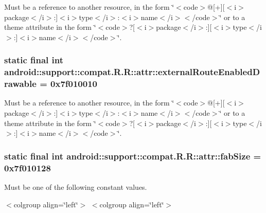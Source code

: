 Must be a reference to another resource, in the form \char`\"{}$<$code$>$@\mbox{[}+\mbox{]}\mbox{[}$<$i$>$package$<$/i$>$:\mbox{]}$<$i$>$type$<$/i$>$:$<$i$>$name$<$/i$>$$<$/code$>$\char`\"{} or to a theme attribute in the form \char`\"{}$<$code$>$?\mbox{[}$<$i$>$package$<$/i$>$:\mbox{]}\mbox{[}$<$i$>$type$<$/i$>$:\mbox{]}$<$i$>$name$<$/i$>$$<$/code$>$\char`\"{}. \hypertarget{classandroid_1_1support_1_1compat_1_1_r_1_1attr_d793f70d661269094a86c8559a3994ca}{
\subsubsection[{externalRouteEnabledDrawable}]{\setlength{\rightskip}{0pt plus 5cm}static final int android::support::compat.R.R::attr::externalRouteEnabledDrawable = 0x7f010010}}
\label{classandroid_1_1support_1_1compat_1_1_r_1_1attr_d793f70d661269094a86c8559a3994ca}


Must be a reference to another resource, in the form \char`\"{}$<$code$>$@\mbox{[}+\mbox{]}\mbox{[}$<$i$>$package$<$/i$>$:\mbox{]}$<$i$>$type$<$/i$>$:$<$i$>$name$<$/i$>$$<$/code$>$\char`\"{} or to a theme attribute in the form \char`\"{}$<$code$>$?\mbox{[}$<$i$>$package$<$/i$>$:\mbox{]}\mbox{[}$<$i$>$type$<$/i$>$:\mbox{]}$<$i$>$name$<$/i$>$$<$/code$>$\char`\"{}. \hypertarget{classandroid_1_1support_1_1compat_1_1_r_1_1attr_17bccf1fa1a043fdaca07889369c5c79}{
\subsubsection[{fabSize}]{\setlength{\rightskip}{0pt plus 5cm}static final int android::support::compat.R.R::attr::fabSize = 0x7f010128}}
\label{classandroid_1_1support_1_1compat_1_1_r_1_1attr_17bccf1fa1a043fdaca07889369c5c79}


Must be one of the following constant values. \begin{TabularC}{0}
\hline
\end{TabularC}
$<$colgroup align=\char`\"{}left\char`\"{}$>$ $<$colgroup align=\char`\"{}left\char`\"{}$>$ 

